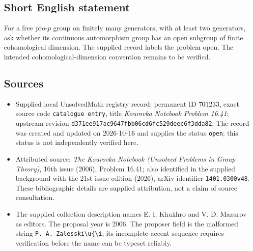 \documentclass[11pt]{article}
\begin{document}
\subsection{Short English statement}
For a free pro-\(p\) group on finitely many generators, with at least two generators, ask whether its continuous automorphism group has an open subgroup of finite cohomological dimension. The supplied record labels the problem open. The intended cohomological-dimension convention remains to be verified.
\subsection{Sources}
\begin{itemize}
\item Supplied local UnsolvedMath registry record: permanent ID \(701233\), exact source code \texttt{catalogue entry}, title \emph{Kourovka Notebook Problem 16.41}; upstream revision \texttt{d371ee917ac9647fbb06cd6fc529deec6f3dda82}. The record was created and updated on 2026-10-16 and supplies the status \texttt{open}; this status is not independently verified here.
\item Attributed source: \emph{The Kourovka Notebook (Unsolved Problems in Group Theory)}, 16th issue (2006), Problem 16.41; also identified in the supplied background with the 21st issue edition (2026), arXiv identifier \texttt{1401.0300v48}. These bibliographic details are supplied attribution, not a claim of source consultation.
\item The supplied collection description names E. I. Khukhro and V. D. Mazurov as editors. The proposal year is 2006. The proposer field is the malformed string \texttt{P. A. Zalesski\textbackslash u\{\textbackslash i}; its incomplete accent sequence requires verification before the name can be typeset reliably.
\end{itemize}
\end{document}
